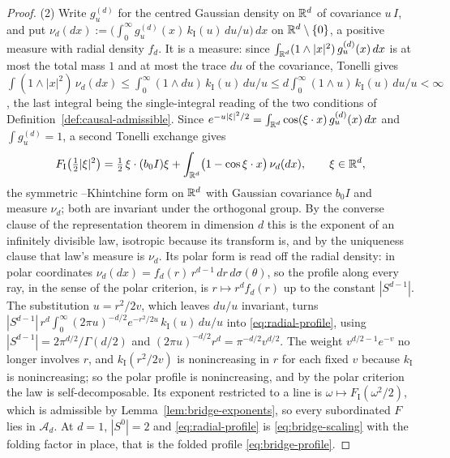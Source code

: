 \begin{proof}
(2) Write $g^{(d)}_u$ for the centred Gaussian density on $\mathbb{R}^d$ of covariance $u\,I$, and put
$\nu_d(dx) := \bigl(\int_0^\infty g^{(d)}_u(x)\,k_{\mathrm I}(u)\,du/u\bigr)\,dx$ on
$\mathbb{R}^d \setminus \{0\}$, a positive measure with radial density $f_d$. It is a \Levy{} measure:
since $\int_{\mathbb{R}^d}(1 \wedge |x|^2)\,g^{(d)}_u(x)\,dx$ is at most the total mass $1$ and at most
the trace $du$ of the covariance, Tonelli gives
$\int (1 \wedge |x|^2)\,\nu_d(dx) \le \int_0^\infty (1 \wedge du)\,k_{\mathrm I}(u)\,du/u
 \le d\int_0^\infty (1 \wedge u)\,k_{\mathrm I}(u)\,du/u < \infty$, the last integral being the
single-integral reading of the two conditions of Definition~\ref{def:causal-admissible}. Since
$e^{-u|\xi|^2/2} = \int_{\mathbb{R}^d}\cos(\xi\cdot x)\,g^{(d)}_u(x)\,dx$ and $\int g^{(d)}_u = 1$, a second
Tonelli exchange gives
\[
  F_{\mathrm I}\bigl(\tfrac12|\xi|^2\bigr)
   = \tfrac12\,\xi\cdot(b_0 I)\xi
     + \int_{\mathbb{R}^d}\bigl(1 - \cos\xi\cdot x\bigr)\,\nu_d(dx), \qquad \xi \in \mathbb{R}^d,
\]
the symmetric \Levy--Khintchine form on $\mathbb{R}^d$ with Gaussian covariance $b_0 I$ and \Levy{}
measure $\nu_d$; both are invariant under the orthogonal group. By the converse clause of the
representation theorem in dimension $d$ this is the exponent of an infinitely divisible law,
isotropic because its transform is, and by the uniqueness clause that law's \Levy{} measure is
$\nu_d$. Its polar form is read off the radial density: in polar coordinates
$\nu_d(dx) = f_d(r)\,r^{d-1}\,dr\,d\sigma(\theta)$, so the profile along every ray, in the
sense of the polar criterion, is $r \mapsto r^d f_d(r)$ up to the constant $|S^{d-1}|$. The
substitution $u = r^2/2v$, which leaves $du/u$ invariant, turns
$|S^{d-1}|\,r^d\int_0^\infty (2\pi u)^{-d/2}e^{-r^2/2u}\,k_{\mathrm I}(u)\,du/u$ into
\ref{eq:radial-profile}, using $|S^{d-1}| = 2\pi^{d/2}/\Gamma(d/2)$ and
$(2\pi u)^{-d/2}r^d = \pi^{-d/2}v^{d/2}$. The weight $v^{d/2-1}e^{-v}$ no longer involves $r$,
and $k_{\mathrm I}(r^2/2v)$ is nonincreasing in $r$ for each fixed $v$ because $k_{\mathrm I}$ is
nonincreasing; so the polar profile is nonincreasing, and by the polar criterion the law is
self-decomposable. Its exponent restricted to a line is $\omega \mapsto F_{\mathrm I}(\omega^2/2)$,
which is admissible by Lemma~\ref{lem:bridge-exponents}, so every subordinated $F$ lies in
$\mathcal{A}_d$. At $d = 1$, $|S^0| = 2$ and \ref{eq:radial-profile} is \ref{eq:bridge-scaling}
with the folding factor in place, that is the folded profile \ref{eq:bridge-profile}.


\end{proof}
